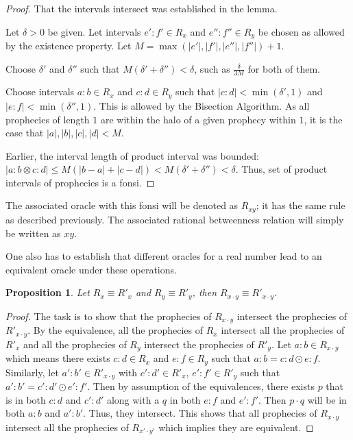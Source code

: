 \documentclass[12pt]{article}
\newtheorem{proposition}{Proposition}[section]
\begin{document}
\begin{proof}
    That the intervals intersect was established in the lemma. 

    Let $\delta > 0$ be given. Let intervals $e':f' \in R_x$ and $e'':f'' \in R_y$ be chosen as allowed by the existence property. Let $M = \max(|e'|, |f'|, |e''|, |f''|) +1$. 

    Choose $\delta'$ and $\delta''$ such that $M(\delta' + \delta'') < \delta$, such as $\frac{\delta}{3M}$ for both of them. 

    Choose intervals $a:b \in R_x$ and $c:d \in R_y$  such that  $|c:d| < \min(\delta', 1)$ and $|e:f| < \min(\delta'', 1)$. This is allowed by the Bisection Algorithm. As all prophecies of length $1$ are within the halo of a given prophecy within $1$, it is the case that $|a|, |b|, |c|, |d| < M$. 
     
    Earlier, the interval length of product interval was bounded:  $|a:b \otimes c:d| \leq M (|b-a| + |c-d|) < M (\delta' + \delta'') < \delta$. Thus, set of product intervals of prophecies is a fonsi. 
    
\end{proof}

The associated oracle with this fonsi will be denoted as $R_{xy}$; it has the same rule as described previously. The associated rational betweenness relation will simply be written as $xy$. 

One also has to establish that different oracles for a real number lead to an equivalent oracle under these operations. 

\begin{proposition}
    Let $R_x \equiv R'_x$ and $R_y \equiv R'_y$, then $R_{x \cdot y} \equiv R'_{x \cdot y}$.
\end{proposition}

\begin{proof}
The task is to show that the prophecies of $R_{x \cdot y}$ intersect the prophecies of $R'_{x \cdot y}$. By the equivalence, all the prophecies of $R_x$ intersect all the prophecies of $R'_x$ and all the prophecies of $R_y$ intersect the prophecies of $R'_y$. Let $a:b \in R_{x \cdot y}$ which means there exists $c:d \in R_x$ and $e:f \in R_y$ such that $a:b = c:d \odot e:f$. Similarly, let $a':b'\in R'_{x \cdot y}$ with $c':d' \in R'_x$, $e':f' \in R'_y$ such that $a':b' = c':d' \odot e':f'$. Then by assumption of the equivalences, there exists $p$ that is in both $c:d$ and $c':d'$ along with a $q$ in both $e:f$ and $e':f'$. Then $p \cdot q$ will be in both $a:b$ and $a':b'$. Thus, they intersect. This shows that all prophecies of $R_{x \cdot y}$ intersect all the prophecies of $R_{x' \cdot y'}$ which implies they are equivalent. 
\end{proof}
\end{document}
